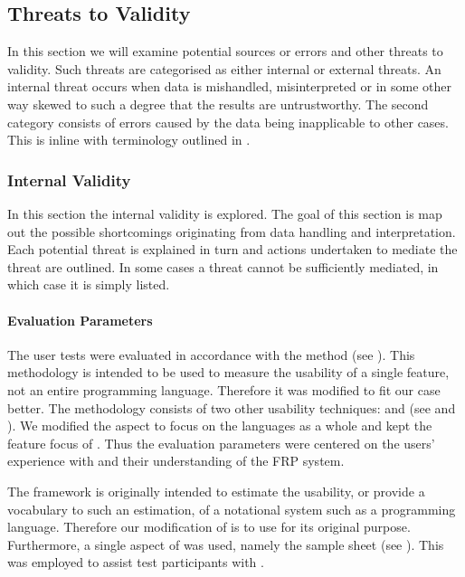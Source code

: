 \subsection{Threats to Validity} \label{sec:validity}
In this section we will examine potential sources or errors and other threats to validity. Such threats are categorised as either internal or external threats. An internal threat occurs when data is mishandled, misinterpreted or in some other way skewed to such a degree that the results are untrustworthy. The second category consists of errors caused by the data being inapplicable to other cases. This is inline with terminology outlined in \cite{mcleod:validity}.


\subsubsection{Internal Validity}
In this section the internal validity is explored. The goal of this section is map out the possible shortcomings originating from data handling and interpretation. Each potential threat is explained in turn and actions undertaken to mediate the threat are outlined. In some cases a threat cannot be sufficiently mediated, in which case it is simply listed.

\paragraph{Evaluation Parameters}
The user tests were evaluated in accordance with the \champagne method (see ). This methodology is intended to be used to measure the usability of a single feature, not an entire programming language. Therefore it was modified to fit our case better. The methodology consists of two other usability techniques: \cognitive and \attentions (see  and ). We modified the \cognitive aspect to focus on the languages as a whole and kept the feature focus of \attention. Thus the evaluation parameters were centered on the users' experience with \fs and their understanding of the \gls{FRP} system.

The \cognitive framework is originally intended to estimate the usability, or provide a vocabulary to such an estimation, of a notational system such as a programming language. Therefore our modification of \champagne is to use \cognitive for its original purpose. Furthermore, a single aspect of \discount was used, namely the sample sheet (see ). This was employed to assist test participants with \fs.


